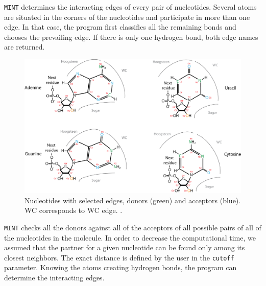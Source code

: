 \documentclass[12pt]{article}
\begin{document}
{\tt MINT} determines the interacting edges of every pair of nucleotides. Several atoms are situated in the corners of the nucleotides and participate in more than one edge. In that case, the program first classifies all the remaining bonds and chooses the prevailing edge. If there is only one hydrogen bond, both edge names are returned. 

\begin{figure}[h!]
\centering
\includegraphics[width = 14cm]{./pictures/donors_acceptors_nucleotides.png}
\caption{Nucleotides with selected edges, donors (green) and acceptors (blue). WC corresponds to WC edge.  \cite{Lescoute2006}.}
\label{Edges}
\end{figure}

{\tt MINT} checks all the donors against all of the acceptors of all possible pairs of all of the nucleotides in the molecule. In order to decrease the computational time, we assumed that the partner for a given nucleotide can be found only among its closest neighbors. The exact distance is defined by the user in the {\tt cutoff} parameter. Knowing the atoms creating hydrogen bonds, the program can determine the interacting edges.
\end{document}
